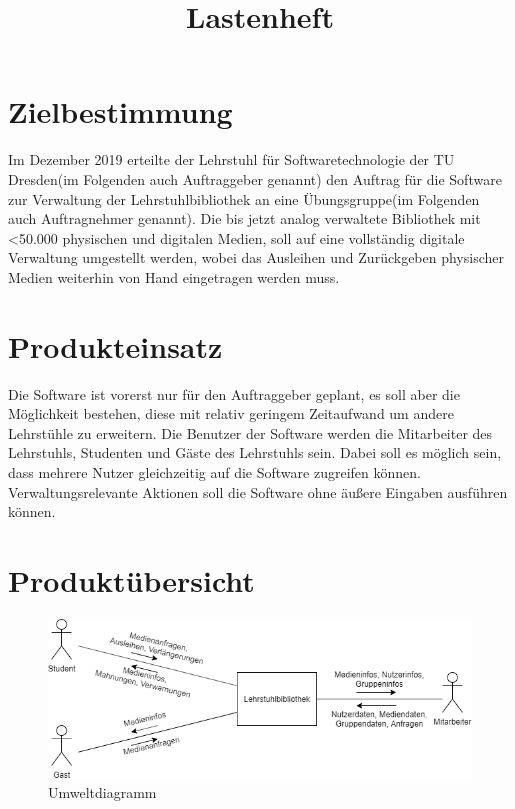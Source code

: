 \documentclass[12pt, a4paper]{article}
\title{Lastenheft}
\begin{document}
\maketitle
\pagebreak
\tableofcontents
\pagebreak

\section{Zielbestimmung}

Im Dezember 2019 erteilte der Lehrstuhl für Softwaretechnologie der TU Dresden(im Folgenden auch Auftraggeber genannt) den Auftrag für die Software zur Verwaltung der Lehrstuhlbibliothek an eine Übungsgruppe(im Folgenden auch Auftragnehmer genannt). Die bis jetzt analog verwaltete Bibliothek mit <50.000 physischen und digitalen Medien, soll auf eine vollständig digitale Verwaltung umgestellt werden, wobei das Ausleihen und Zurückgeben physischer Medien weiterhin von Hand eingetragen werden muss.

\section{Produkteinsatz}
Die Software ist vorerst nur für den Auftraggeber geplant, es soll aber die Möglichkeit bestehen, diese mit relativ geringem Zeitaufwand um andere Lehrstühle zu erweitern.
Die Benutzer der Software werden die Mitarbeiter des Lehrstuhls, Studenten und Gäste des Lehrstuhls sein. Dabei soll es möglich sein, dass mehrere Nutzer gleichzeitig auf die Software zugreifen können. Verwaltungsrelevante Aktionen soll die Software ohne äußere Eingaben ausführen können.

\section{Produktübersicht}

	\begin{figure}[h!]
		\includegraphics[width=\linewidth]{diagrams/umweltdiagramm.png}
		\caption{Umweltdiagramm}
		\label{fig:umweltdiagramm}
	\end{figure}
\end{document}
